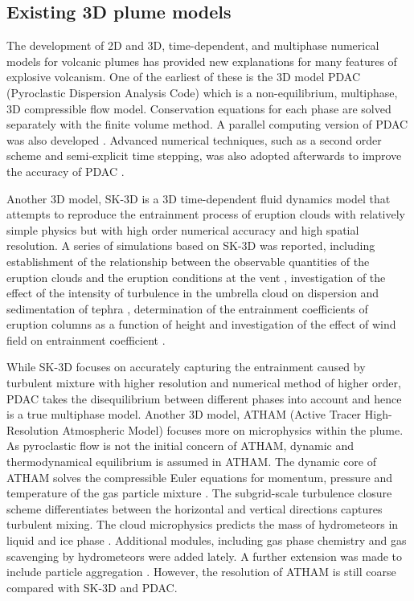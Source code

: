 \subsection{Existing 3D plume models}

The development of 2D and 3D, time-dependent, and multiphase numerical models for volcanic plumes has provided new explanations for many features of explosive volcanism. One of the earliest of these is the 3D model PDAC (Pyroclastic Dispersion Analysis Code) \citep{neri2003multiparticle}  which is a non-equilibrium, multiphase, 3D compressible flow model. Conservation equations for each phase are solved separately with the finite volume method. A parallel computing version of PDAC was also developed \citep{ongaro2007parallel}. Advanced numerical techniques, such as a second order scheme and semi-explicit time stepping, was also adopted afterwards to improve the accuracy of PDAC \citep{carcano2013semi}. 

Another 3D model, SK-3D \citep{suzuki2005numerical} is a 3D time-dependent fluid dynamics model that attempts to reproduce the entrainment process of eruption clouds with relatively simple physics but with high order numerical accuracy and high spatial resolution.
A series of simulations based on SK-3D was reported, including establishment of the relationship between the observable quantities of the eruption clouds and the eruption conditions at the vent \citep{suzuki2009three}, investigation of the effect of the intensity of turbulence in the umbrella cloud on dispersion and sedimentation of tephra \citep{koyaguchi2009effect}, determination of the entrainment coefficients of eruption columns as a function of height \citep{suzuki2010numerical} and investigation of the effect of wind field on entrainment coefficient \citep{suzuki20133d}. 

While SK-3D focuses on accurately capturing the entrainment caused by turbulent mixture with higher resolution and numerical method of higher order, PDAC takes the disequilibrium between different phases into account and hence is a true multiphase model. Another 3D model, ATHAM (Active Tracer High-Resolution Atmospheric Model) \citep{oberhuber1998volcanic} focuses more on microphysics within the plume. As pyroclastic flow is not the initial concern of ATHAM, dynamic and thermodynamical equilibrium is assumed in ATHAM. The dynamic core of ATHAM solves the compressible Euler equations for momentum, pressure and temperature of the gas particle mixture \citep{oberhuber1998volcanic}. The subgrid-scale turbulence closure scheme differentiates between the horizontal and vertical directions \citep{herzog2003prognostic} captures turbulent mixing. The cloud microphysics predicts the mass of hydrometeors in liquid and ice phase \citep{herzog1998effect}. Additional modules, including gas phase chemistry \citep{trentmann2002simulation} and gas scavenging by hydrometeors \citep{textor2003injection} were added lately. A further extension was made to include particle aggregation \citep{textor2006volcanic1, textor2006volcanic2}. However, the resolution of ATHAM is still coarse compared with SK-3D and PDAC.

